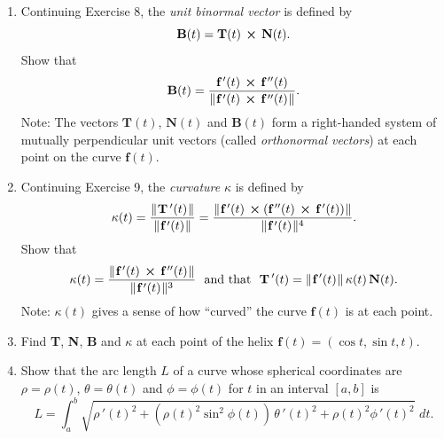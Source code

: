 \begin{enumerate}[\bfseries 1.]
\begin{displaymath}
  \end{displaymath}
  Show that
  \begin{displaymath}
   \textbf{N}(t) = \dfrac{\Crossprod{\textbf{f}\,'(t)\,}{(\Crossprod{\textbf{f}\,''(t)\,}{\,\textbf{f}\,'(t)})}}{
    \norm{\textbf{f}\,'(t)} \,\norm{\Crossprod{\textbf{f}\,''(t)\,}{\,\textbf{f}\,'(t)}}} .
  \end{displaymath}
 \item Continuing Exercise 8, the \emph{unit binormal vector}  is defined by
  \begin{displaymath}
   \textbf{B}(t) = \textbf{T}(t)\, \bm{\times} \,\textbf{N}(t) .
  \end{displaymath}
  Show that
  \begin{displaymath}
   \textbf{B}(t) = \dfrac{\textbf{f}\,'(t)\, \bm{\times} \,\textbf{f}\,''(t)}{
    \lVert\mspace{1mu}\textbf{f}\,'(t)\, \bm{\times} \,\textbf{f}\,''(t)\mspace{1mu}\rVert} .
  \end{displaymath}
  Note: The vectors $\textbf{T}(t)$, $\textbf{N}(t)$ and $\textbf{B}(t)$ form a right-handed system of mutually
  perpendicular unit vectors (called \emph{orthonormal vectors}) at each point on the curve $\textbf{f}(t)$.
 \item Continuing Exercise 9, the \emph{curvature} $\kappa$  is defined by
  \begin{displaymath}
   \kappa(t) = \dfrac{\lVert\mspace{1mu}\textbf{T}\,'(t)\mspace{1mu}\rVert}{\lVert\mspace{1mu}\textbf{f}\,'(t)\mspace{1mu}\rVert} =
    \dfrac{\lVert\mspace{1mu}\textbf{f}\,'(t)\, \bm{\times} (\textbf{f}\,''(t)\, \bm{\times} \,\textbf{f}\,'(t))\mspace{1mu}\rVert}{
    \lVert\mspace{1mu}\textbf{f}\,'(t)\mspace{1mu}\rVert^4}.
  \end{displaymath}
  Show that
  \begin{displaymath}
   \kappa(t) = \dfrac{\lVert\mspace{1mu}\textbf{f}\,'(t)\, \bm{\times} \,\textbf{f}\,''(t)\mspace{1mu}\rVert}{\lVert\mspace{1mu}\textbf{f}\,'(t)\mspace{1mu}\rVert^3}
   \text{~~and that~~} \textbf{T}\,'(t) = \lVert\mspace{1mu}\textbf{f}\,'(t)\mspace{1mu}\rVert \,\kappa(t) \, \textbf{N}(t) .
  \end{displaymath}
  Note: $\kappa(t)$ gives a sense of how ``curved'' the curve $\textbf{f}(t)$ is at each point.
 \item Find \textbf{T}, \textbf{N}, \textbf{B} and $\kappa$ at each point of the helix
  $\textbf{f}(t) = (\cos t ,\sin t,t)$. 
 \item Show that the arc length $L$ of a curve whose spherical coordinates are $\rho = \rho(t)$, $\theta = \theta(t)$
  and $\phi = \phi(t)$ for $t$ in an interval $[a,b]$ is
  \begin{displaymath}
   L = \int_{a}^{b} \sqrt{\rho\,'(t)^2 + (\rho(t)^2 \sin^2 \phi(t))\,\theta\,'(t)^2 + \rho(t)^2 \phi\,'(t)^2}\,\, dt .
  \end{displaymath}
\end{enumerate}
